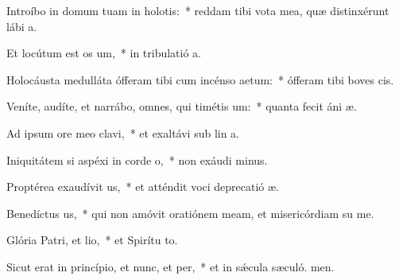 \item Introíbo in domum tuam in holotis:~* reddam tibi vota mea, quæ distinxérunt lábi a.
\item Et locútum est os um,~* in tribulatió a.
\item Holocáusta medulláta ófferam tibi cum incénso aetum:~* ófferam tibi boves  cis.
\item Veníte, audíte, et narrábo, omnes, qui timétis um:~* quanta fecit áni æ.
\item Ad ipsum ore meo clavi,~* et exaltávi sub lin a.
\item Iniquitátem si aspéxi in corde o,~* non exáudi minus.
\item Proptérea exaudívit us,~* et atténdit voci deprecatió æ.
\item Benedíctus us,~* qui non amóvit oratiónem meam, et misericórdiam su  me.
\item Glória Patri, et lio,~* et Spirítu to.
\item Sicut erat in princípio, et nunc, et per,~* et in sǽcula sæculó. men.
